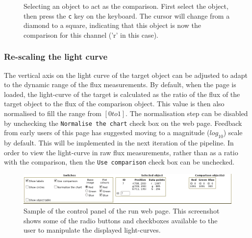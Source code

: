 \begin{figure}
  \centering
  \setlength{\fboxrule}{1pt}

  \caption{Selecting an object to act as the comparison. First select the object, then press the \texttt{c} key on the keyboard. The cursor will change from a diamond to a square, indicating that this object is now the comparison for this channel ('r' in this case).}
  \label{fig:selectcomparison}
\end{figure}  

\subsubsection{Re-scaling the light curve}
The vertical axis on the light curve of the target object can be adjusted to adapt to the dynamic range of the flux measurements. By default, when the page is loaded, the light-curve of the target is calculated as the ratio of the flux of the target object to the flux of the comparison object. This value is then also normalised to fill the range from $[0 to 1]$. The normalisation step can be disabled by unchecking the \texttt{Normalise the chart} check box on the web page. Feedback from early users of this page has suggested moving to a magnitude ($log_{10}$) scale by default. This will be implemented in the next iteration of the pipeline. In order to view the light-curve in raw flux measurements, rather than as a ratio with the comparison, then the \texttt{Use comparison} check box can be unchecked.

\begin{figure}
  \centering
  \includegraphics[width=140mm]{images/webcontrols.png}
  \caption{Sample of the control panel of the run web page. This screenshot shows some of the radio buttons and checkboxes available to the user to manipulate the displayed light-curves. }
  \label{fig:webcontrols}
\end{figure}  

